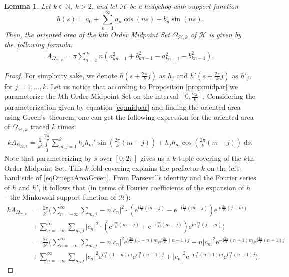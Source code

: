 \documentclass{amsart}
\newtheorem{lem}[thm]{Lemma}
\theoremstyle{definition}
\numberwithin{equation}{section}
\renewcommand{\d}{\mathrm{d}}
\newcommand{\e}{\mathrm{e}}
\renewcommand{\i}{\mathrm{i}}
\begin{document}
\begin{lem}\label{lemOrientedAreaMiddlePoint}
    Let $k\in\mathbb{N}$, $k>2$, and let $\mathcal{H}$ be a hedgehog with support function  $$h(s)=a_0+\sum_{n=1}^{\infty}a_n\cos(ns)+b_n\sin(ns).$$ Then, the oriented area of the $k$th Order Midpoint Set $\Omega_{\mathcal{H},k}$ of $\mathcal{H}$ is given by the~following formula:
    \begin{align}
    \label{eq:MiddleOrientedArea}A_{\Omega_{\mathcal{H},k}} = \pi\sum_{n=1}^\infty n(a^2_{kn-1}+b^2_{kn-1}-a^2_{kn+1}-b^2_{kn+1}).
    \end{align}
\end{lem}
\begin{proof}
    For simplicity sake, we denote $h\left(s+\frac{2\pi}{k}j\right)$ as $h_{j}$ and $h'\left(s+\frac{2\pi}{k}j\right)$ as $h'_{j}$, for $j=1,\ldots,k$.   Let us notice that according to Proposition \ref{prop:midpar} we parameterize the $k$th Order Midpoint Set on the interval $[0,\frac{2\pi}{k}]$. Considering the parameterization given by equation \eqref{eq:midpar} and finding the oriented area using Green's~theorem, one can get the following expression for the oriented area of $\Omega_{\mathcal{H},k}$ traced $k$ times:
    \begin{align}
    \label{eqOmegaAreaGreen}kA_{\Omega_{\mathcal{H},k}} = \frac{2}{k^2}\int \limits_{0}^{2\pi}\sum_{m,j=1}^k h_jh_m'\sin\left(\frac{2\pi}{k}(m-j)\right)+h_jh_m\cos\left(\frac{2\pi}{k}(m-j)\right) \; \d s.
    \end{align}
    Note that parameterizing by $s$ over $[0,2\pi]$ gives us a $k$-tuple covering of the $k$th Order Midpoint Set.  This $k$-fold covering
    explains the prefactor $k$ on the left-hand side of
    \eqref{eqOmegaAreaGreen}. From Parseval's identity and the Fourier series of $h$ and $h'$, it follows that (in terms of Fourier coefficients of the expansion of $h$ -- the Minkowski support function of $\mathcal{H}$):
    \begin{align*}
        kA_{\Omega_{\mathcal{H},k}} &= \frac{2\pi}{k^2}\Bigg(\sum_{n=-\infty}^\infty\sum_{m,j} -n|c_n|^2\cdot \left({\e}^{\i \frac{2\pi}{k}(m-j)}-{\e}^{-\i \frac{2\pi}{k}(m-j)}\right) {\e}^{\i n\frac{2\pi}{k}(j-m)} \\&+ \sum_{n=-\infty}^\infty\sum_{m,j} |c_n|^2\cdot \left({\e}^{\i \frac{2\pi}{k}(m-j)}+{\e}^{-\i \frac{2\pi}{k}(m-j)}\right) {\e}^{\i n\frac{2\pi}{k}(j-m)}\Bigg)\\&=\frac{2\pi}{k^2}\Bigg(\sum_{n=-\infty}^\infty\sum_{m,j} -n|c_n|^2 {\e}^{\i \frac{2\pi}{k}(1-n)m}{\e}^{\i \frac{2\pi}{k}(n-1)j} +n|c_n|^2{\e}^{-\i \frac{2\pi}{k}(n+1)m}{\e}^{\i \frac{2\pi}{k}(n+1)j} \\&+  \sum_{n=-\infty}^\infty\sum_{m,j}|c_n|^2{\e}^{\i \frac{2\pi}{k}(1-n)m}{\e}^{\i \frac{2\pi}{k}(n-1)j}+|c_n|^2{\e}^{-\i \frac{2\pi}{k}(n+1)m}{\e}^{\i \frac{2\pi}{k}(n+1)j}\Bigg).

\end{align*}
\end{proof}
\end{document}
